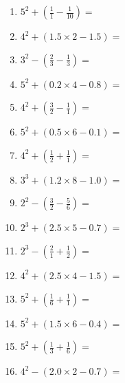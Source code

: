 \documentclass[12pt]{article}
\begin{document}
\begin{enumerate}
\item \large $ 5^{2} + (\frac{1}{1} - \frac{1}{10}) = $ \vspace{1.6cm}
\item \large $ 4^{2} + (1.5 \times 2 - 1.5) = $ \vspace{1.6cm}
\item \large $ 3^{2} - (\frac{2}{3} - \frac{1}{3}) = $ \vspace{1.6cm}
\item \large $ 5^{2} + (0.2 \times 4 - 0.8) = $ \vspace{1.6cm}
\item \large $ 4^{2} + (\frac{3}{2} - \frac{1}{1}) = $ \vspace{1.6cm}
\item \large $ 5^{2} + (0.5 \times 6 - 0.1) = $ \vspace{1.6cm}
\newpage
\item \large $ 4^{2} + (\frac{1}{2} + \frac{1}{1}) = $ \vspace{1.6cm}
\item \large $ 3^{3} + (1.2 \times 8 - 1.0) = $ \vspace{1.6cm}
\item \large $ 2^{2} - (\frac{3}{2} - \frac{5}{6}) = $ \vspace{1.6cm}
\item \large $ 2^{3} + (2.5 \times 5 - 0.7) = $ \vspace{1.6cm}
\item \large $ 2^{3} - (\frac{2}{1} + \frac{1}{2}) = $ \vspace{1.6cm}
\item \large $ 4^{2} + (2.5 \times 4 - 1.5) = $ \vspace{1.6cm}
\item \large $ 5^{2} + (\frac{1}{6} + \frac{1}{1}) = $ \vspace{1.6cm}
\item \large $ 5^{2} + (1.5 \times 6 - 0.4) = $ \vspace{1.6cm}
\item \large $ 5^{2} + (\frac{1}{3} + \frac{1}{6}) = $ \vspace{1.6cm}
\item \large $ 4^{2} - (2.0 \times 2 - 0.7) = $ \vspace{1.6cm}
\end{enumerate}\newpage
\end{document}
